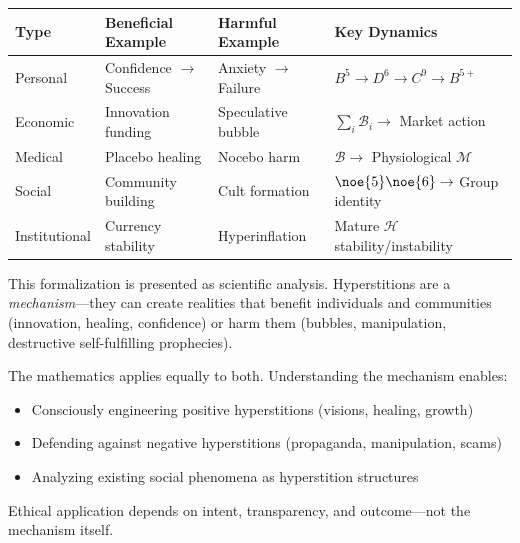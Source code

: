\begin{center}
\small
\renewcommand{\arraystretch}{1.3}
\begin{tabularx}{\textwidth}{>{\raggedright\arraybackslash}p{2.5cm}|>{\raggedright\arraybackslash}X|>{\raggedright\arraybackslash}X|>{\raggedright\arraybackslash}X}
\toprule
\textbf{Type} & \textbf{Beneficial Example} & \textbf{Harmful Example} & \textbf{Key Dynamics} \\
\midrule
Personal & Confidence $\to$ Success & Anxiety $\to$ Failure & $B^5 \to D^6 \to C^9 \to B^{5+}$ \\
\midrule
Economic & Innovation funding & Speculative bubble & $\sum_i \mathcal{B}_i \to$ Market action \\
\midrule
Medical & Placebo healing & Nocebo harm & $\mathcal{B} \to$ Physiological $\mathcal{M}$ \\
\midrule
Social & Community building & Cult formation & $\noe{5}\noe{6} \to$ Group identity \\
\midrule
Institutional & Currency stability & Hyperinflation & Mature $\mathcal{H}$ stability/instability \\
\bottomrule
\end{tabularx}
\end{center}

\begin{tcolorbox}[colback=gray!5!white,colframe=gray!75!black,title=\textbf{Academic Note on Neutrality}]
This formalization is presented as scientific analysis. Hyperstitions are a \emph{mechanism}---they can create realities that benefit individuals and communities (innovation, healing, confidence) or harm them (bubbles, manipulation, destructive self-fulfilling prophecies).

The mathematics applies equally to both. Understanding the mechanism enables:
\begin{itemize}
    \item Consciously engineering positive hyperstitions (visions, healing, growth)
    \item Defending against negative hyperstitions (propaganda, manipulation, scams)
    \item Analyzing existing social phenomena as hyperstition structures
\end{itemize}
Ethical application depends on intent, transparency, and outcome---not the mechanism itself.
\end{tcolorbox}

